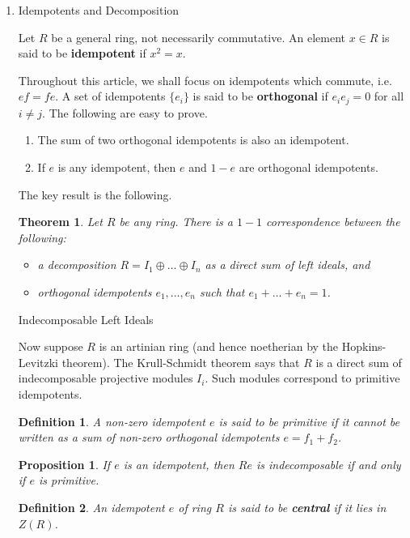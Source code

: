 \documentclass[UTF8]{ctexart}
\newtheorem*{prop}{Proposition}
\newtheorem*{defi}{Definition}
\newtheorem*{thm}{Theorem}
\begin{document}
\begin{enumerate}
\item Idempotents and Decomposition\parencite{idempotents-and-decomposition}

Let $R$ be a general ring, not necessarily commutative. An element $x\in R$ is said to be \textbf{idempotent} if $x^2 = x$.

Throughout this article, we shall focus on idempotents which commute, i.e. $ef = fe$. A set of idempotents $\{e_i\}$ is said to be \textbf{orthogonal} if $e_{i}e_{j} = 0$ for all $i \neq j$. The following are easy to prove.

\begin{enumerate}
  \item The sum of two orthogonal idempotents is also an idempotent.
  \item If $e$ is any idempotent, then $e$ and $1-e$ are orthogonal idempotents.
\end{enumerate}

The key result is the following.

\begin{thm}
Let $R$ be any ring. There is a $1-1$ correspondence between the following:

\begin{itemize}
  \item a decomposition $R = I_1 \oplus \ldots \oplus I_n$ as a direct sum of left ideals, and
  \item orthogonal idempotents $e_1,\ldots,e_n$ such that $e_1 + \ldots + e_n = 1$.
\end{itemize}

\end{thm}

Indecomposable Left Ideals

Now suppose $R$ is an artinian ring (and hence noetherian by the Hopkins-Levitzki theorem). The Krull-Schmidt theorem says that $R$ is a direct sum of indecomposable projective modules $I_i$. Such modules correspond to primitive idempotents.
\begin{defi}
A non-zero idempotent $e$ is said to be \textit{primitive} if it cannot be written as a sum of non-zero orthogonal idempotents $e = f_1 + f_2$.
\end{defi}
\begin{prop}
If $e$ is an idempotent, then $Re$ is indecomposable if and only if $e$ is primitive.
\end{prop}

\begin{defi}
An idempotent $e$ of ring $R$ is said to be \textbf{central} if it lies in $Z(R)$.
\end{defi}


\end{enumerate}
\end{document}
